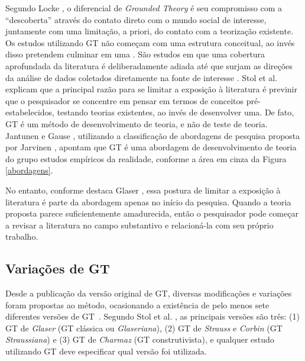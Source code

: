 Segundo Locke \cite{locke2001grounded}, o diferencial de \textit{Grounded
Theory} é seu compromisso com a ``descoberta'' através do contato direto com o
mundo social de interesse, juntamente com uma limitação, a priori, do contato
com a teorização existente. Os estudos utilizando \acrshort{GT} não começam com
uma estrutura conceitual, ao invés disso pretendem culminar em uma \cite{miles1994qualitative}.
São estudos em que uma cobertura aprofundada da literatura é deliberadamente
adiada até que surjam as direções da análise de dados coletados diretamente
na fonte de interesse \cite{punch2013introduction}. Stol et al. \cite{stol2016grounded}
explicam que a principal razão para se limitar a exposição à literatura é previnir
que o pesquisador se concentre em pensar em termos de conceitos pré-estabelecidos,
testando teorias existentes, ao invés de desenvolver uma. De fato, \acrshort{GT}
é um método de desenvolvimento de teoria, e não de teste de teoria. Jantunen e
Gause \cite{jantunen_using_gt_approach}, utilizando a classificação de abordagens
de pesquisa proposta por Jarvinen \cite{jarvinen_mapping_2008}, apontam que
\acrshort{GT} é uma abordagem de desenvolvimento de teoria do grupo estudos
empíricos da realidade, conforme a área em cinza da Figura \ref{abordagens}.


No entanto, conforme destaca Glaser \cite{glaser1992basics}, essa postura de
limitar a exposição à literatura é parte da abordagem apenas no início da
pesquisa. Quando a teoria proposta parece suficientemente amadurecida, então o
pesquisador pode começar a revisar a literatura no campo substantivo e
relacioná-la com seu próprio trabalho.

\subsection{Variações de \acrshort{GT}}

Desde a publicação da versão original de \acrshort{GT}, diversas modificações
e variações foram propostas ao método, ocasionando a existência de pelo menos
sete diferentes versões de \acrfull{GT}~\cite{denzin2007grounded}. Segundo
Stol et al. \cite{stol2016grounded}, as principais versões são três: (1)
\acrshort{GT} de \textit{Glaser} (GT clássica ou \textit{Glaseriana}), (2)
\acrshort{GT} de \textit{Strauss} e \textit{Corbin} (GT \textit{Straussiana}) e
(3) \acrshort{GT} de \textit{Charmaz} (GT construtivista), e qualquer
estudo utilizando \acrshort{GT} deve especificar qual versão foi utilizada.

